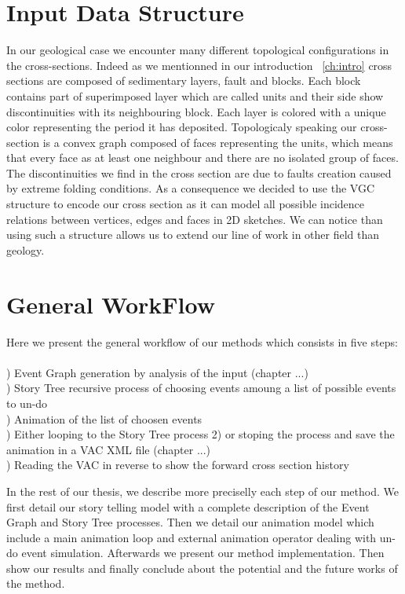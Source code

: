 \documentclass[12pt, a4paper]{report} %
\begin{document}
\section{Input Data Structure}
In our geological case we encounter many different topological configurations in the cross-sections. Indeed as we mentionned in our introduction ~\ref{ch:intro} cross sections are composed of sedimentary layers, fault and blocks. Each block contains part of superimposed layer which are called units and their side show discontinuities with its neighbouring block. Each layer is colored with a unique color representing the period it has deposited. Topologicaly speaking our cross-section is a convex graph composed of faces representing the units, which means that every face as at least one neighbour and there are no isolated group of faces. The discontinuities we find in the cross section are due to faults creation caused by extreme folding conditions. As a consequence we decided to use the VGC \cite{vgc} structure to encode our cross section as it can model all possible incidence relations between vertices, edges and faces in 2D sketches. We can notice than using such a structure allows us to extend our line of work in other field than geology.

\section{General WorkFlow}

Here we present the general workflow  of our methods which consists in five steps:\\\\

) Event Graph generation by analysis of the input (chapter ...)\\
) Story Tree recursive process of choosing events amoung a list of possible events to un-do\\
) Animation of the list of choosen events \\
) Either looping to the Story Tree process 2) or stoping the process and save the animation in a VAC XML file\cite{vac} (chapter ...)\\
) Reading the VAC in reverse to show the forward cross section history

In the rest of our thesis, we describe more preciselly each step of our method. We first detail our story telling model with a complete description of the Event Graph and Story Tree processes. Then we detail our animation model  which include a main animation loop and external animation operator dealing with un-do event simulation. Afterwards we present our method implementation. Then show our results and finally conclude about the potential and the future works of the method. 
\end{document}
